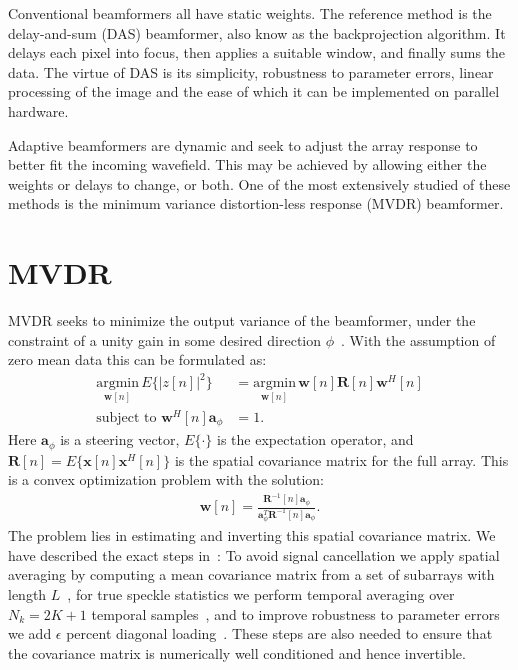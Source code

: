 \documentclass[10pt,journal,draftclsnofoot,onecolumn]{IEEEtran}
\newcommand\nn{\nonumber\\}
\newcommand\argmin[1]{\text{arg}\;\underset{#1}{\text{min}}}
\newcommand\T{^{\scriptscriptstyle T}}
\renewcommand\H{^{\scriptscriptstyle H}}
\renewcommand\vec[1]{\boldsymbol{#1}}
\newcommand\mat[1]{\boldsymbol{#1}}
\newcommand\1{\vec 1}
\renewcommand*\a{\vec a}
\newcommand*\w{\vec w}
\newcommand*\x{\vec x}
\newcommand*\R{\mat R}
\newcommand*\Ri{\R^{-1}}
\renewcommand\argmin{\text{argmin}}
\begin{document}
Conventional beamformers all have static weights. The reference method is the delay-and-sum (DAS) beamformer, also know as the backprojection algorithm. It delays each pixel into focus, then applies a suitable window, and finally sums the data. The virtue of DAS is its simplicity, robustness to parameter errors, linear processing of the image and the ease of which it can be implemented on parallel hardware.

Adaptive beamformers are dynamic and seek to adjust the array response to better fit the incoming wavefield. This may be achieved by allowing either the weights or delays to change, or both. One of the most extensively studied of these methods is the minimum variance distortion-less response (MVDR) beamformer.

\section{MVDR}\label{sec:mvdr}

MVDR seeks to minimize the output variance of the beamformer, under the constraint of a unity gain in some desired direction $\phi$~\cite{Capon1969}. With the assumption of zero mean data this can be formulated as: 
%
\begin{align}
\underset{\w[n]}{\argmin}\, E\{\big|z[n]\big|^2\} &= \underset{\w[n]}{\argmin}\, \w[n]\R[n]\w\H[n]\nn
\text{subject to } \w^H[n]\a_\phi &= 1.\label{eq:mvdr_definition}
\end{align}
%
Here $\a_\phi$ is a steering vector, $E\{\cdot\}$ is the expectation operator, and $\R[n] = E\{\x[n]\x\H[n]\}$ is the spatial covariance matrix for the full array. This is a convex optimization problem with the solution:
%
\begin{gather}
\vec w[n] = \frac{\Ri[n]\a_\phi}{\a_\phi\T\Ri[n]\a_\phi}.\label{eq:mvdr_weights}
\end{gather}
The problem lies in estimating and inverting this spatial covariance matrix. We have described the exact steps in~\cite{Buskenes2014}: To avoid signal cancellation we apply spatial averaging by computing a mean covariance matrix from a set of subarrays with length $L$~\cite{Kailath1985}, for true speckle statistics we perform temporal averaging over $N_k = 2K+1$ temporal samples~\cite{Synnevag2009}, and to improve robustness to parameter errors we add {\large$\epsilon$} percent diagonal loading~\cite{Cox1987,Maksym1979}. These steps are also needed to ensure that the covariance matrix is numerically well conditioned and hence invertible.
\end{document}
